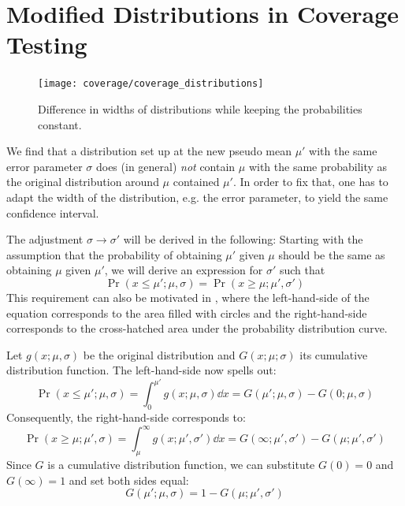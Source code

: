 \newpage
\section{Modified Distributions in Coverage Testing}
\label{app:coverage_uncertainty}


\begin{figure}
    \centering
    \texttt{[image: coverage/coverage\_distributions]}
    \caption{Difference in widths of distributions while keeping the probabilities constant.}
    \label{fig:coverage_distributions}
\end{figure}


We find that a distribution set up at the new pseudo mean $\mu'$ with the same error parameter $\sigma$ does (in general) \emph{not} contain $\mu$ with the same probability as the original distribution around $\mu$ contained $\mu'$.
In order to fix that, one has to adapt the width of the distribution, e.g. the error parameter, to yield the same confidence interval.

The adjustment $\sigma \rightarrow \sigma'$ will be derived in the following:
Starting with the assumption that the probability of obtaining $\mu'$ given $\mu$ should be the same as obtaining $\mu$ given $\mu'$, we will derive an expression for $\sigma'$ such that
\begin{equation}
    \Pr(x \leq \mu'; \mu, \sigma) = \Pr(x \geq \mu; \mu', \sigma')
\end{equation}
This requirement can also be motivated in , where the left-hand-side of the equation corresponds to the area filled with circles and the right-hand-side corresponds to the cross-hatched area under the probability distribution curve.

Let $g(x; \mu, \sigma)$ be the original distribution and $G(x; \mu; \sigma)$ its cumulative distribution function. The left-hand-side now spells out:
\begin{equation}
    \Pr(x \leq \mu'; \mu, \sigma) = \int_0^{\mu'} g(x; \mu, \sigma) \dd{x} = G(\mu'; \mu, \sigma) - G(0; \mu, \sigma)
\end{equation}
Consequently, the right-hand-side corresponds to:
\begin{equation}
    \Pr(x \geq \mu; \mu', \sigma) = \int_\mu^\infty g(x; \mu', \sigma') \dd{x} = G(\infty; \mu', \sigma') - G(\mu; \mu', \sigma')
\end{equation}
Since $G$ is a cumulative distribution function, we can substitute $G(0) = 0$ and $G(\infty) = 1$ and set both sides equal:
\begin{equation}
    G(\mu'; \mu, \sigma) = 1 - G(\mu; \mu', \sigma')
\end{equation}

